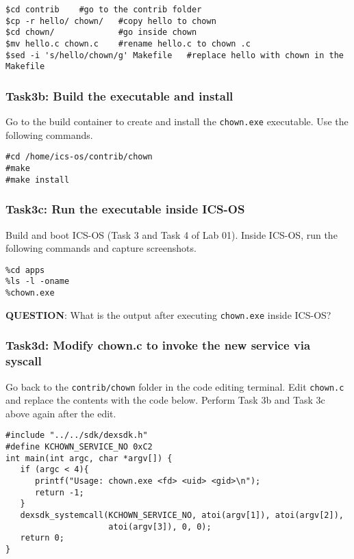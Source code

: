 \documentclass[a4paper, 11pt,oneside]{article}
\begin{document}
\begin{verbatim}
$cd contrib	   #go to the contrib folder
$cp -r hello/ chown/   #copy hello to chown
$cd chown/             #go inside chown
$mv hello.c chown.c    #rename hello.c to chown .c
$sed -i 's/hello/chown/g' Makefile   #replace hello with chown in the Makefile
\end{verbatim}

\subsubsection*{Task3b: Build the executable and install}
Go to the build container to create and install the \texttt{chown.exe} 
executable. Use the following commands.
\begin{verbatim}
#cd /home/ics-os/contrib/chown
#make
#make install
\end{verbatim}

\subsubsection*{Task3c: Run the executable inside ICS-OS}
Build and boot ICS-OS (Task 3 and Task 4 of Lab 01). Inside ICS-OS, run the 
following commands and capture screenshots.

\begin{verbatim}
%cd apps
%ls -l -oname
%chown.exe
\end{verbatim}

\textbf{QUESTION}: What is the output after executing \texttt{chown.exe} inside 
ICS-OS? \newline

\subsubsection*{Task3d: Modify chown.c to invoke the new service via syscall}
Go back to the \texttt{contrib/chown} folder in the code editing terminal. Edit 
\texttt{chown.c} and replace the contents with the code below. Perform Task 3b 
and Task 3c above again after the edit.

\begin{verbatim}
#include "../../sdk/dexsdk.h"
#define KCHOWN_SERVICE_NO 0xC2
int main(int argc, char *argv[]) {
   if (argc < 4){ 
      printf("Usage: chown.exe <fd> <uid> <gid>\n");
      return -1; 
   }   
   dexsdk_systemcall(KCHOWN_SERVICE_NO, atoi(argv[1]), atoi(argv[2]), 
                     atoi(argv[3]), 0, 0); 
   return 0;
}
\end{verbatim}
\end{document}
